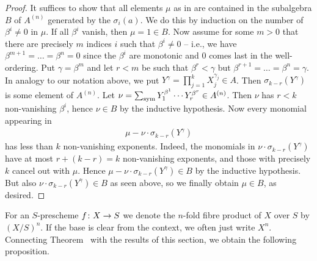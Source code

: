 \documentclass[a4paper,parskip=half,numbers=enddot, DIV=12]{scrreprt}
\begin{document}
\begin{proof}
	It suffices to show that all elements $\mu$ as in  are contained in the subalgebra $B$ of $A^{(n)}$ generated by the $\sigma_i(a)$. We do this by induction on the number of $\beta^i\neq 0$ in $\mu$. If all $\beta^i$ vanish, then $\mu=1\in B$. Now assume for some $m>0$ that there are precisely $m$ indices $i$ such that $\beta^i\neq 0$ -- i.e., we have $\beta^{m+1}=\ldots=\beta^n=0$ since the $\beta^i$ are monotonic and $0$ comes last in the well-ordering. Put $\gamma=\beta^m$ and let $r<m$ be such that $\beta^r<\gamma$ but $\beta^{r+1}=\ldots=\beta^n=\gamma$. In analogy to our notation above, we put $Y^\gamma=\prod_{j=1}^kX_j^{\gamma_j}\in A$. Then $\sigma_{k-r}(Y^\gamma)$ is some element of $A^{(n)}$. Let $\nu=\sum_{\mathrm{sym}} Y_1^{\beta^1}\cdots Y_r^{\beta^r}\in A^{(n)}$. Then $\nu$ has $r<k$ non-vanishing $\beta^i$, hence $\nu\in B$ by the inductive hypothesis. Now every monomial appearing in
	\begin{align*}
		\mu-\nu\cdot \sigma_{k-r}(Y^\gamma)
	\end{align*}
	has less than $k$ non-vanishing exponents. Indeed, the monomials in $\nu\cdot \sigma_{k-r}(Y^\gamma)$ have at most $r+(k-r)=k$ non-vanishing exponents, and those with precisely $k$ cancel out with $\mu$. Hence $\mu-\nu\cdot\sigma_{k-r}(Y^\gamma)\in B$ by the inductive hypothesis. But also $\nu\cdot\sigma_{k-r}(Y^\gamma)\in B$ as seen above, so we finally obtain $\mu\in B$, as desired.
\end{proof}
For an $S$-prescheme $f\colon X\morphism S$ we denote the $n$-fold fibre product of $X$ over $S$ by $(X/S)^n$. If the base is clear from the context, we often just write $X^n$. Connecting Theorem~ with the results of this section, we obtain the following proposition.
\end{document}
